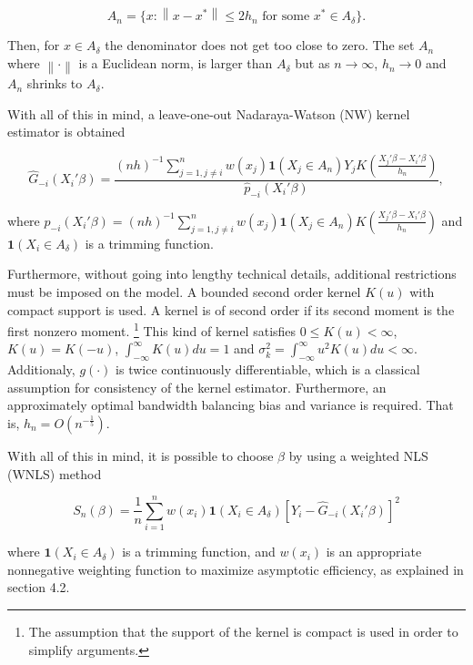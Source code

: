 \documentclass[a4paper]{article}
\newcommand{\norm}[1]{\left\lVert#1\right\rVert}
\begin{document}
\[ A_n = \{ x : \norm{x - x^*} \leq 2h_n \text{ for some } x^* \in A_\delta\}.
\]

Then, for $x \in A_\delta$ the denominator does not get too close to zero. The set $A_n$ where $\norm{\cdot}$ is a Euclidean norm, is larger than $A_\delta$ but as $ n \rightarrow \infty $, $h_n \rightarrow 0$ and $A_n$ shrinks to $A_\delta$. 

With all of this in mind, a leave-one-out Nadaraya-Watson (NW) kernel estimator is obtained

\begin{equation}
\hat{G}_{-i}(X_i'\beta) = \frac{(nh)^{-1}\sum_{j=1, j \neq i }^{n}  w(x_j)\mathbf{1}{(X_j \in A_n)}Y_jK\left(\frac{X_j'\beta - X_i'\beta}{h_n}\right)}{\hat{p}_{-i}(X_i'\beta)},
\end{equation}

where $\hat{p}_{-i}(X_i'\beta) = (nh)^{-1}\sum_{j=1,j \neq i}^{n}w(x_j)\mathbf{1}{(X_j \in A_n)}K\left(\frac{X_j'\beta - X_i'\beta}{h_n}\right)$ and \linebreak  $\mathbf{1}{(X_i \in A_\delta)}$ is a trimming function.


Furthermore, without going into lengthy technical details, additional restrictions must be imposed on the model. A bounded second order kernel $K(u)$ with compact support is used. A kernel is of second order if its second moment is the first nonzero moment. \footnote{The assumption that the support of the kernel is compact is used in order to simplify arguments.} This kind of kernel satisfies $0 \leq K(u) < \infty$, $K(u)=K(-u)$, $\int_{- \infty}^{\infty} K(u)du = 1$ and $\sigma_k^2 = \int_{-\infty}^{\infty} u^2K(u)du < \infty$. Additionaly, $g(\cdot)$ is twice continuously differentiable, which is a classical assumption for consistency of the kernel estimator. Furthermore, an approximately optimal bandwidth balancing bias and variance is required. That is, $ h_n = O(n^{-\frac{1}{5}})$.

With all of this in mind, it is possible to choose $\beta$ by using a weighted NLS (WNLS) method

\begin{equation}
S_n(\beta) = \frac{1}{n} \sum_{i=1}^{n}  w(x_i)\mathbf{1}{(X_i \in A_\delta)[Y_i - \hat{G}_{-i}(X_i'\beta)]^2}
\end{equation}

where $\mathbf{1}{(X_i \in A_\delta)}$ is a trimming function, and $w(x_i)$ is an appropriate nonnegative weighting function to maximize asymptotic efficiency, as explained in section 4.2. 
\end{document}
